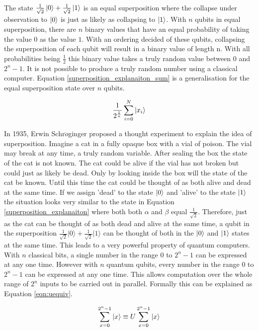 The state $\frac{1}{\sqrt{2}}\left\vert{0}\right\rangle+\frac{1}{\sqrt{2}}\left\vert{1}\right\rangle$ is an equal superposition where the collapse under observation to $\left\vert{0}\right\rangle$ is just as likely as collapsing to $\left\vert{1}\right\rangle$.
With $n$ qubits in equal superposition, there are $n$ binary values that have an equal probability of taking the value $0$ as the value $1$.
With an ordering decided of these qubits, collapsing the superposition of each qubit will result in a binary value of length n.
With all probabilities being $\frac{1}{2}$ this binary value takes a truly random value between $0$ and $2^n-1$.
It is not possible to produce a truly random number using a classical computer.
Equation \ref{superposition_explanaiton_sum} is a generalisation for the equal superposition state over $n$ qubits.

\begin{equation}
\label{superposition_explanaiton_sum}
\frac{1}{2^{\frac{1}{n}}}\sum\limits_{i=0}^N \left\vert{x_i}\right\rangle
\end{equation}

In 1935, Erwin Schr$\ddot{o}$ginger\cite{SchroedingersCat} proposed a thought experiment to explain the idea of superposition.
Imagine a cat in a fully opaque box with a vial of poison.
The vial may break at any time, a truly random variable.
After sealing the box the state of the cat is not known.
The cat could be alive if the vial has not broken but could just as likely be dead.
Only by looking inside the box will the state of the cat be known.
Until this time the cat could be thought of as both alive and dead at the same time.
If we assign 'dead' to the state $\left\vert{0}\right\rangle$ and 'alive' to the state $\left\vert{1}\right\rangle$ the situation looks very similar to the state in Equation \ref{superposition_explanaiton} where both both $\alpha$ and $\beta$ equal $\frac{1}{\sqrt{2}}$.
Therefore, just as the cat can be thought of as both dead and alive at the same time, a qubit in the superposition $\frac{1}{\sqrt{2}}\vert0\rangle+\frac{1}{\sqrt{2}}\vert1\rangle$ can be thought of both in the $\left\vert{0}\right\rangle$ and $\left\vert{1}\right\rangle$ states at the same time.
This leads to a very powerful property of quantum computers.
With $n$ classical bits, a single number in the range $0$ to $2^n-1$ can be expressed at any one time.
However with $n$ quantum qubits, every number in the range $0$ to $2^n-1$ can be expressed at any one time.
This allows computation over the whole range of $2^n$ inputs to be carried out in parallel.
Formally this can be explained as Equation \ref{eqn:uequiv}.

\begin{equation}
\label{eqn:uequiv}
 \sum_{x=0}^{2^n-1}\left\vert{x}\right\rangle\equiv{U\sum_{x=0}^{2^n-1}\left\vert{x}\right\rangle}
\end{equation}

